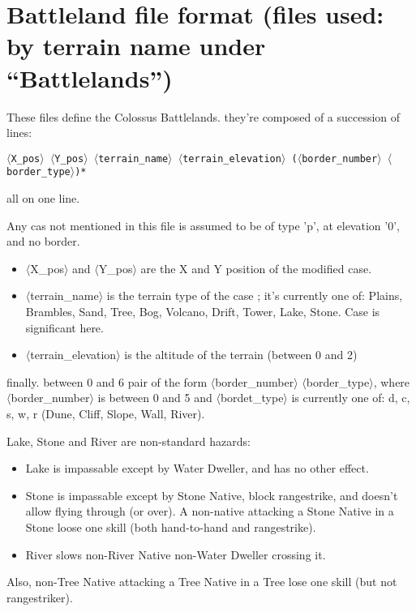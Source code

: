 \documentclass{article}
\begin{document}
\section{Battleland file format (files used: by terrain name under ``Battlelands'')}
\label{BATTLELANDS}

These files define the Colossus Battlelands. they're composed of a succession of lines:

\texttt{$\langle$X\_pos$\rangle$ $\langle$Y\_pos$\rangle$ $\langle$terrain\_name$\rangle$ $\langle$terrain\_elevation$\rangle$ ($\langle$border\_number$\rangle$ $\langle$border\_type$\rangle$)*}

all on one line.

Any cas not mentioned in this file is assumed to be of type 'p', at elevation '0', and no border.

\begin{itemize}
\item $\langle$X\_pos$\rangle$ and $\langle$Y\_pos$\rangle$ are the X and Y position of the modified case.
\item $\langle$terrain\_name$\rangle$ is the terrain type of the case ; it's currently one of: Plains, Brambles, Sand, Tree, Bog, Volcano, Drift, Tower, Lake, Stone. Case is significant here.
\item $\langle$terrain\_elevation$\rangle$ is the altitude of the terrain (between 0 and 2)
\end{itemize}

finally. between 0 and 6 pair of the form $\langle$border\_number$\rangle$ $\langle$border\_type$\rangle$, where $\langle$border\_number$\rangle$ is between 0 and 5 and $\langle$bordet\_type$\rangle$ is currently one of: d, c, s, w, r (Dune, Cliff, Slope, Wall, River).

Lake, Stone and River are non-standard hazards:

\begin{itemize}
\item Lake is impassable except by Water Dweller, and has no other effect.
\item Stone is impassable except by Stone Native, block rangestrike, and doesn't allow flying through (or over). A non-native attacking a Stone Native in a Stone loose one skill (both hand-to-hand and rangestrike).
\item River slows non-River Native non-Water Dweller crossing it.
\end{itemize}

Also, non-Tree Native attacking a Tree Native in a Tree lose one skill (but not rangestriker).
\end{document}
